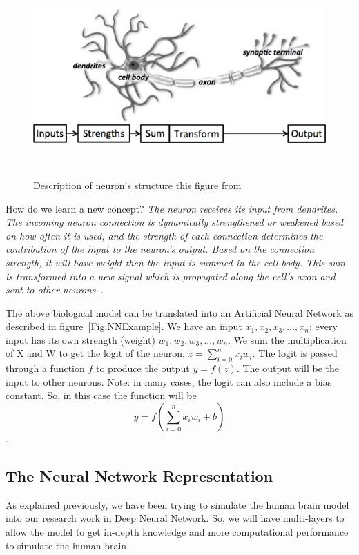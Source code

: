 \begin{figure}[!t] \includegraphics[width=\linewidth]{./Figures/Ch_2_Background/neuron_structure.png}
\caption{Description of neuron's structure this figure from~\cite{DLFundamentals}}
~\label{Fig:Neuron_Structure}
\end{figure}%
 
How do we learn a new concept? \textit{The neuron receives its input from dendrites. The incoming neuron connection is dynamically strengthened or weakened based on how often it is used, and the strength of each connection determines the contribution of the input to the neuron's output. Based on the connection strength, it will have weight then the input is summed in the cell body. This sum is transformed into a new signal which is propagated along the cell's axon and sent to other neurons~\cite{DLFundamentals}}.

The above biological model can be translated into an Artificial Neural Network as described in figure~\ref{Fig:NNExample}. We have an input $x_1,x_2,x_3,...,x_n$; every input has its own strength (weight) $w_1,w_2,w_3,...,w_n$. We sum the multiplication of X and W to get the logit of the neuron, $z =  \sum_{i=0}^{n} x_i w_i $. The logit is passed through a function $f$ to produce the output $ y = f(z)$. The output will be the input to other neurons. Note: in many cases, the logit can also include a bias constant. So, in this case the function will be $$ y = f(\sum_{i=0}^{n} x_i w_i + b)$$.
 
\subsection{The Neural Network Representation}
As explained previously, we have been trying to simulate the human brain model into our research work in Deep Neural Network. So, we will have multi-layers to allow the model to get in-depth knowledge and more computational performance to simulate the human brain. 

